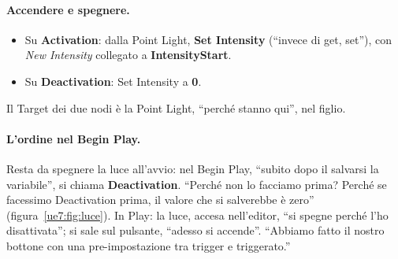 \paragraph{Accendere e spegnere.}
\begin{itemize}
  \item Su \textbf{Activation}: dalla Point Light, \textbf{Set Intensity} (``invece di
        get, set''), con \emph{New Intensity} collegato a \textbf{IntensityStart}.
  \item Su \textbf{Deactivation}: Set Intensity a \textbf{0}.
\end{itemize}
Il Target dei due nodi è la Point Light, ``perché stanno qui'', nel figlio.

\paragraph{L'ordine nel Begin Play.} Resta da spegnere la luce all'avvio: nel Begin Play,
``subito dopo il salvarsi la variabile'', si chiama \textbf{Deactivation}. ``Perché non lo
facciamo prima? Perché se facessimo Deactivation prima, il valore che si salverebbe è
zero'' (figura~\ref{ue7:fig:luce}). In Play: la luce, accesa nell'editor, ``si spegne
perché l'ho disattivata''; si sale sul pulsante, ``adesso si accende''. ``Abbiamo fatto il
nostro bottone con una pre-impostazione tra trigger e triggerato.''

